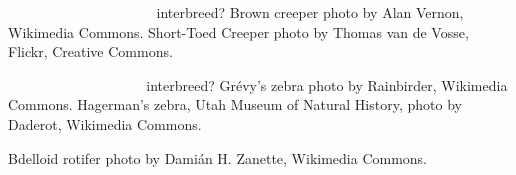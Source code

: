 \documentclass[t]{beamer}
\begin{document}
{
\begin{frame}[b]{\textcolor{white}{Can these sister species} \textcolor{orange5}{interbreed?}}
\Tiny\textcolor{gray!50!white}{Brown creeper photo by Alan Vernon, Wikimedia Commons. Short-Toed Creeper photo by Thomas van de Vosse, Flickr, Creative Commons.}
\end{frame}
}

{
\begin{frame}[b]{\textcolor{white}{Can these two species} \textcolor{orange5}{interbreed?}}
\Tiny\textcolor{gray!50!white}{Grévy's zebra photo by Rainbirder, Wikimedia Commons. Hagerman's zebra, Utah Museum of Natural History, photo by Daderot, Wikimedia Commons.}
\end{frame}
}

{
\begin{frame}[b]{}
\Tiny\textcolor{gray!20!white}{Bdelloid rotifer photo by Damián H. Zanette, Wikimedia Commons.}
\end{frame}
}
\end{document}

